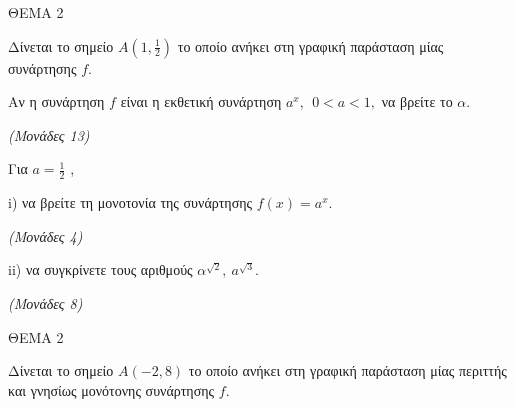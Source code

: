 \documentclass[11pt,a4paper,twoside]{book}
\newcommand{\monades}[1]{\hfill \textit{(Μονάδες #1)}}
\begin{document}
\vspace{4mm}

ΘΕΜΑ 2

Δίνεται το σημείο $Α\left( 1,\frac{1}{2} \right)$ το οποίο ανήκει στη γραφική παράσταση μίας συνάρτησης $f.$

\begin{alist}
\item Αν η συνάρτηση $f$ είναι η εκθετική συνάρτηση $a^{x},\ \ 0 < a < 1,$ να βρείτε το $\alpha.$

\monades{13}

\item Για $a = \frac{1}{2}$ ,

i) να βρείτε τη μονοτονία της συνάρτησης $f(x) = a^{x}.$

\monades{4}

ii) να συγκρίνετε τους αριθμούς $\alpha^{\sqrt{2}},{\ a}^{\sqrt{3}}.$

\monades{8}
\end{alist}

\vspace{4mm}

ΘΕΜΑ 2

Δίνεται το σημείο $Α( - 2,8)$ το οποίο ανήκει στη γραφική παράσταση μίας περιττής και γνησίως μονότονης συνάρτησης $f.$
\end{document}
